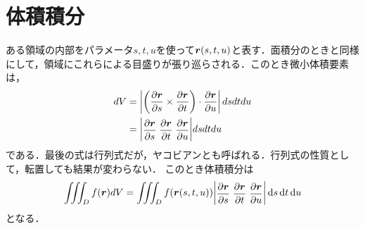 \documentclass[a4paper,10pt,uplatex]{jsarticle}
\newcommand{\ds}{\displaystyle}
\begin{document}
\section*{体積積分}
ある領域の内部をパラメータ$s,t,u$を使って$\vb*{r}(s,t,u)$と表す．面積分のときと同様にして，領域にこれらによる目盛りが張り巡らされる．このとき微小体積要素は，
\begin{align}
    dV &= \left| \left(\pdv{\vb*{r}}{s} \times \pdv{\vb*{r}}{t}\right) \cdot \pdv{\vb*{r}}{u} \right| dsdtdu \\
    &= \mqty| \ds \pdv{\vb*{r}}{s} \; \pdv{\vb*{r}}{t} \; \pdv{\vb*{r}}{u} | dsdtdu
\end{align}
である．最後の式は行列式だが，ヤコビアンとも呼ばれる．行列式の性質として，転置しても結果が変わらない．
このとき体積積分は
\begin{equation}
    \iiint_D f(\vb*{r}) dV = \iiint_D f(\vb*{r}(s,t,u)) \mqty| \ds \pdv{\vb*{r}}{s} \; \pdv{\vb*{r}}{t} \; \pdv{\vb*{r}}{u} | \dd{s}\dd{t}\dd{u}
\end{equation}
となる．
\end{document}

